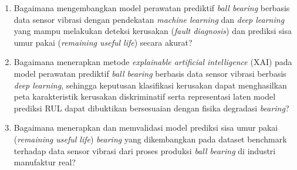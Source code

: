 \begin{enumerate}

  \item {\color{blue}Bagaimana mengembangkan model perawatan prediktif {\color{blue}\emph{ball bearing}}
          berbasis data sensor vibrasi dengan pendekatan \emph{machine learning}
          dan \emph{deep learning} yang mampu melakukan deteksi kerusakan
          (\emph{fault diagnosis}) dan prediksi sisa umur pakai
          (\emph{remaining useful life}) secara akurat?}

  \item {\color{blue}Bagaimana menerapkan metode \emph{explainable artificial intelligence}
        (XAI) pada model perawatan prediktif {\color{blue}\emph{ball bearing}}
        berbasis data sensor vibrasi berbasis
        \emph{deep learning}, sehingga keputusan klasifikasi kerusakan dapat
        menghasilkan peta karakteristik kerusakan diskriminatif serta
        representasi laten model prediksi RUL dapat dibuktikan bersesuaian
        dengan fisika degradasi \emph{bearing}?}

  \item {\color{blue}Bagaimana menerapkan dan memvalidasi model prediksi
        sisa umur pakai (\emph{remaining useful life}) \emph{bearing} yang
        dikembangkan pada dataset benchmark terhadap data sensor vibrasi dari
        proses produksi \emph{ball bearing} di industri manufaktur real?}

\end{enumerate}





